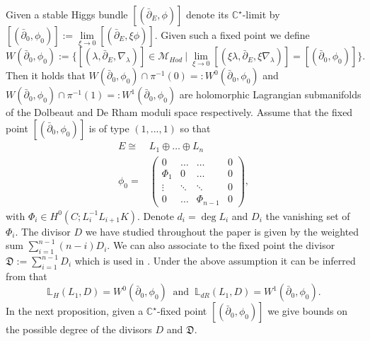 \documentclass[twoside, 11pt]{article}
\numberwithin{equation}{section}
\theoremstyle{theorem}
\numberwithin{theorem}{section}
\theoremstyle{definition}
\newcommand{\pa}{\partial}
\newcommand{\C}{\mathbb C}
\begin{document}
Given a stable Higgs bundle $[(\bar\pa_E,\phi)]$ denote its $\C^{\star}$-limit by $[(\bar\pa_0,\phi_0)] := \lim\limits_{\xi\to 0}[(\bar\pa_E,\xi\phi)]$. Given such a fixed point we define 
%
\begin{equation}
W(\bar\pa_0,\phi_0):= \{[(\lambda,\bar\pa_E,\nabla_{\lambda})] \in \mathcal M_{Hod}~|~ \lim\limits_{\xi\to 0} [(\xi\lambda,\bar\pa_E,\xi\nabla_{\lambda})] = [(\bar\pa_0,\phi_0)]\}.
\end{equation}
%
Then it holds that $ W(\bar\pa_0,\phi_0)\cap \pi^{-1}(0) =: W^0(\bar\pa_0,\phi_0)$ and $ W(\bar\pa_0,\phi_0)\cap \pi^{-1}(1) =: W^1(\bar\pa_0,\phi_0)$ are holomorphic Lagrangian submanifolds of the Dolbeaut and De Rham moduli space respectively. Assume that the fixed point $[(\bar\pa_0,\phi_0)]$ is of type $(1,...,1)$ so that 
%
\begin{equation}\label{eqn-Hodge-bundle-form}
\begin{split}
E\cong& L_1\oplus\dots\oplus L_n\\
\phi_0 =& \begin{pmatrix} 0 & \dots & \dots & 0 \\ \Phi_1 & 0 & \dots & 0\\ \vdots & \ddots & \ddots & 0 \\ 0 & \dots & \Phi_{n-1} & 0 \end{pmatrix},
\end{split}
\end{equation}
%
with $\Phi_i \in H^0(C; L_i^{-1}L_{i+1} K)$. Denote $d_i = \deg L_i$ and $D_i$ the vanishing set of $\Phi_i$. The divisor $D$ we have studied throughout the paper is given by the weighted sum $\sum\limits_{i=1}^{n-1} (n-i)D_i$. We can also associate to the fixed point the divisor $\mathfrak D := \sum\limits_{i=1}^{n-1} D_i$ which is used in \cite{HH22}. Under the above assumption it can be inferred from \cite{CW18} that 
%
\begin{equation}
\mathbb L_H(L_1,D) = W^0(\bar\pa_0,\phi_0)~\text{ and }~\mathbb L_{dR}(L_1,D) = W^1(\bar\pa_0,\phi_0). 
\end{equation}
%
In the next proposition, given a $\C^{\star}$-fixed point $[(\bar\pa_0,\phi_0)]$ we give bounds on the possible degree of the divisors $D$ and $\mathfrak D$. 
%
\end{document}
